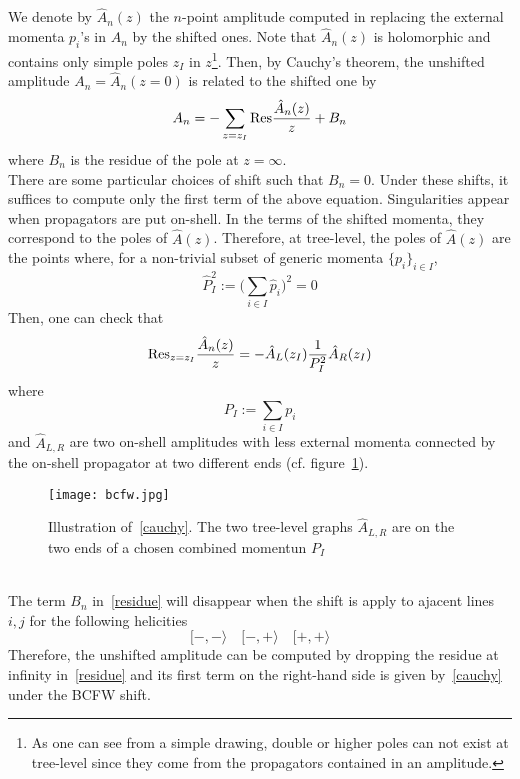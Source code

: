 \\\\
We denote by $\hat{A}_n(z)$ the $n$-point amplitude computed in replacing the external momenta $p_i$'s in $A_n$ by the shifted ones. 
Note that $\hat{A}_n(z)$ is holomorphic and contains only simple poles $z_I$ in $z$\footnote{As one can see from a simple drawing, double or higher poles can not exist at tree-level since they come from the propagators contained in an amplitude.}.
Then, by Cauchy's theorem, the unshifted amplitude $A_n = \hat{A}_n(z=0)$ is related to the shifted one by
\begin{equation}\label{residue}
A_n = - \sum_{z = z_I}\mathrm{Res}\frac{\hat{A}_n(z)}{z} + B_n
\end{equation} 
where $B_n$ is the residue of the pole at $z = \infty$.
\\
There are some particular choices of shift such that $B_n = 0$.
Under these shifts, it suffices to compute only the first term of the above equation. 
Singularities appear when propagators are put on-shell. 
In the terms of the shifted momenta, they correspond to the poles of $\hat{A}(z)$.
Therefore, at tree-level, the poles of $\hat{A}(z)$ are the points where, for a non-trivial subset of generic momenta $\{p_i\}_{i\in I}$, 
\begin{equation}
\hat{P}_I^2 := \big( \sum_{i\in I} \hat{p}_i \big)^2 = 0
\end{equation}   
%
Then, one can check that
\begin{equation}\label{cauchy}
\mathrm{Res}_{z=z_I}\frac{\hat{A}_n(z)}{z} = - \hat{A}_L(z_I)\frac{1}{P_I^2}\hat{A}_R(z_I)
\end{equation}
where 
\begin{equation}
P_I := \sum_{i\in I}p_i
\end{equation}
and $\hat{A}_{L,R}$ are two on-shell amplitudes with less external momenta connected by the on-shell propagator at two different ends (cf. figure~\ref{fig_cauchy}).
\begin{figure}[h]
  \centering
  \texttt{[image: bcfw.jpg]}
  \caption{Illustration of~\cref{cauchy}. The two tree-level graphs $\hat{A}_{L,R}$ are on the two ends of a chosen combined momentun $P_I$}
  \label{fig_cauchy}
\end{figure}
\\
The term $B_n$ in~\cref{residue} will disappear when the shift is apply to ajacent lines $i,j$ for the following helicities~\cite{ArkaniHamed:2008yf}
\begin{equation}
[-,-\rangle \quad [-,+\rangle \quad [+,+\rangle
\end{equation}
Therefore, the unshifted amplitude can be computed by dropping the residue at infinity in~\cref{residue} and its first term on the right-hand side is given by~\cref{cauchy} under the BCFW shift.
%
